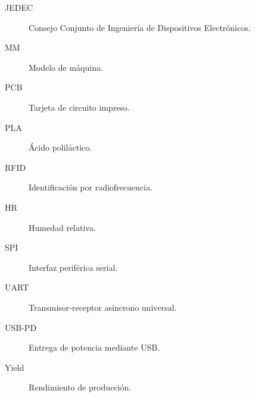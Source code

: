 \begin{description}
    \item[JEDEC] Consejo Conjunto de Ingeniería de Dispositivos Electrónicos.
    
    \item[MM] Modelo de máquina.
    
    \item[PCB] Tarjeta de circuito impreso.
    
    \item[PLA] Ácido poliláctico.
    
    \item[RFID] Identificación por radiofrecuencia.
    
    \item[HR] Humedad relativa.
    
    \item[SPI] Interfaz periférica serial.
    
    \item[UART] Transmisor-receptor asíncrono universal.
    
    \item[USB-PD] Entrega de potencia mediante USB.
    
    \item[Yield] Rendimiento de producción.
\end{description}